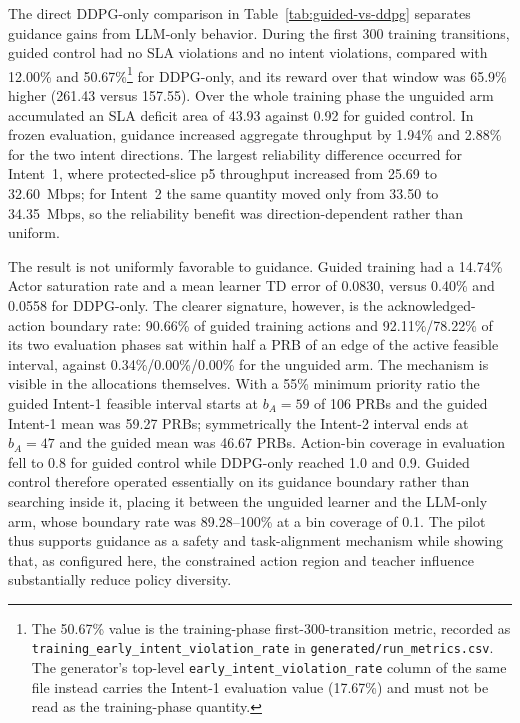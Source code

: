 
The direct DDPG-only comparison in Table~\ref{tab:guided-vs-ddpg} separates guidance gains from
LLM-only behavior. During the
first 300 training transitions, guided control had no SLA violations and no intent violations,
compared with 12.00\% and 50.67\%\footnote{The 50.67\% value is the training-phase
first-300-transition metric, recorded as
\texttt{training\_early\_intent\_violation\_rate} in \texttt{generated/run\_metrics.csv}. The
generator's top-level \texttt{early\_intent\_violation\_rate} column of the same file instead
carries the Intent-1 evaluation value (17.67\%) and must not be read as the training-phase
quantity.} for DDPG-only, and its reward over that window was 65.9\%
higher (261.43 versus 157.55). Over the whole training phase the unguided arm accumulated an
SLA deficit area of 43.93 against 0.92 for guided control. In frozen evaluation, guidance
increased aggregate throughput by 1.94\% and 2.88\% for the two intent directions. The largest
reliability difference occurred for Intent~1, where protected-slice p5 throughput increased
from 25.69 to 32.60~Mbps; for Intent~2 the same quantity moved only from 33.50 to
34.35~Mbps, so the reliability benefit was direction-dependent rather than uniform.

The result is not uniformly favorable to guidance. Guided training had a 14.74\% Actor
saturation rate and a mean learner TD error of 0.0830, versus 0.40\% and 0.0558 for DDPG-only.
The clearer signature, however, is the acknowledged-action boundary rate: 90.66\% of guided
training actions and 92.11\%/78.22\% of its two evaluation phases sat within half a PRB of an
edge of the active feasible interval, against 0.34\%/0.00\%/0.00\% for the unguided arm. The
mechanism is visible in the allocations themselves. With a 55\% minimum priority ratio the
guided Intent-1 feasible interval starts at $b_A=59$ of 106 PRBs and the guided Intent-1 mean
was 59.27 PRBs; symmetrically the Intent-2 interval ends at $b_A=47$ and the guided mean was
46.67 PRBs. Action-bin coverage in evaluation fell to 0.8 for guided control while DDPG-only
reached 1.0 and 0.9. Guided control therefore operated essentially on its guidance boundary
rather than searching inside it, placing it between the unguided learner and the LLM-only arm,
whose boundary rate was 89.28--100\% at a bin coverage of 0.1. The pilot thus supports
guidance as a safety and task-alignment mechanism while showing that, as configured here, the
constrained action region and teacher influence substantially reduce policy diversity.
\fi
\FloatBarrier

